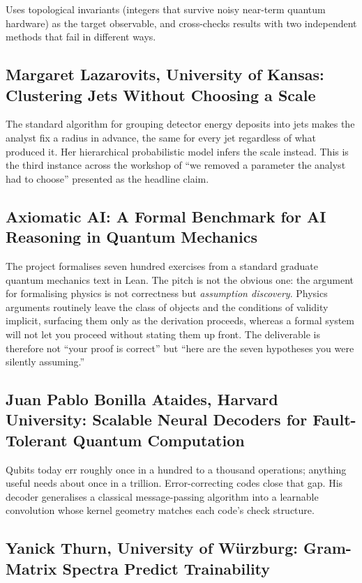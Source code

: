\documentclass[11pt]{article}
\begin{document}
Uses topological invariants (integers that survive noisy near-term quantum hardware) as the target observable, and cross-checks results with two independent methods that fail in different ways.

\subsection*{Margaret Lazarovits, University of Kansas: Clustering Jets Without Choosing a Scale}

The standard algorithm for grouping detector energy deposits into jets makes the analyst fix a radius in advance, the same for every jet regardless of what produced it. Her hierarchical probabilistic model infers the scale instead. This is the third instance across the workshop of ``we removed a parameter the analyst had to choose'' presented as the headline claim.

\subsection*{Axiomatic AI: A Formal Benchmark for AI Reasoning in Quantum Mechanics}

The project formalises seven hundred exercises from a standard graduate quantum mechanics text in Lean. The pitch is not the obvious one: the argument for formalising physics is not correctness but \emph{assumption discovery}. Physics arguments routinely leave the class of objects and the conditions of validity implicit, surfacing them only as the derivation proceeds, whereas a formal system will not let you proceed without stating them up front. The deliverable is therefore not ``your proof is correct'' but ``here are the seven hypotheses you were silently assuming.''

\subsection*{Juan Pablo Bonilla Ataides, Harvard University: Scalable Neural Decoders for Fault-Tolerant Quantum Computation}

Qubits today err roughly once in a hundred to a thousand operations; anything useful needs about once in a trillion. Error-correcting codes close that gap. His decoder generalises a classical message-passing algorithm into a learnable convolution whose kernel geometry matches each code's check structure.

\subsection*{Yanick Thurn, University of W\"urzburg: Gram-Matrix Spectra Predict Trainability}
\end{document}

